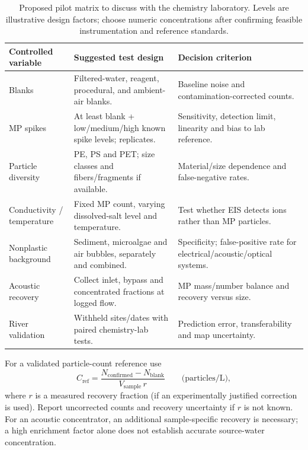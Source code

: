 \documentclass[10pt,a4paper]{article}
\begin{document}
\begin{table}[H]\centering\footnotesize
\caption{Proposed pilot matrix to discuss with the chemistry laboratory. Levels are illustrative design factors; choose numeric concentrations after confirming feasible instrumentation and reference standards.}\label{tab:matrix}
\begin{tabularx}{\linewidth}{@{}p{2.4cm}X X@{}}\toprule
Controlled variable & Suggested test design & Decision criterion \\\midrule
Blanks & Filtered-water, reagent, procedural, and ambient-air blanks. & Baseline noise and contamination-corrected counts. \\
MP spikes & At least blank + low/medium/high known spike levels; replicates. & Sensitivity, detection limit, linearity and bias to lab reference. \\
Particle diversity & PE, PS and PET; size classes and fibers/fragments if available. & Material/size dependence and false-negative rates. \\
Conductivity / temperature & Fixed MP count, varying dissolved-salt level and temperature. & Test whether EIS detects ions rather than MP particles. \\
Nonplastic background & Sediment, microalgae and air bubbles, separately and combined. & Specificity; false-positive rate for electrical/acoustic/optical systems. \\
Acoustic recovery & Collect inlet, bypass and concentrated fractions at logged flow. & MP mass/number balance and recovery versus size. \\
River validation & Withheld sites/dates with paired chemistry-lab tests. & Prediction error, transferability and map uncertainty. \\
\bottomrule\end{tabularx}
\end{table}

For a validated particle-count reference use
\begin{equation}
 C_{\mathrm{ref}}=\frac{N_{\mathrm{confirmed}}-N_{\mathrm{blank}}}{V_{\mathrm{sample}}\,r}
\qquad\text{(particles/L)},
\end{equation}
where $r$ is a measured recovery fraction (if an experimentally justified correction is used). Report uncorrected counts and recovery uncertainty if $r$ is not known. For an acoustic concentrator, an additional sample-specific recovery is necessary; a high enrichment factor alone does not establish accurate source-water concentration.
\end{document}
